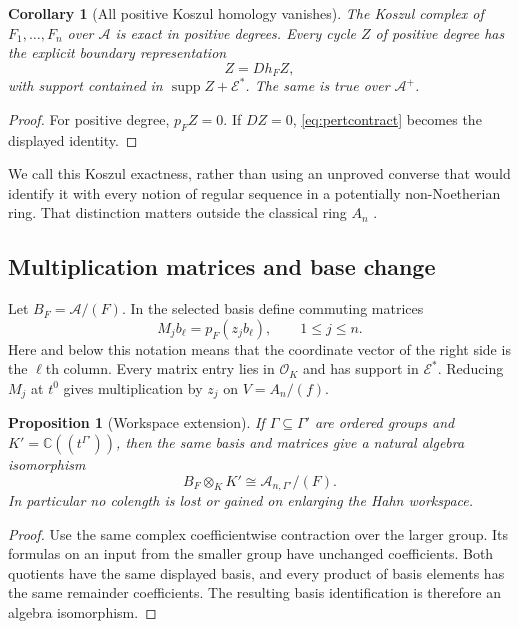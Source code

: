 \documentclass[11pt,letterpaper]{article}
\newtheorem{proposition}[proposition]{Proposition}
\newtheorem{corollary}[corollary]{Corollary}
\theoremstyle{definition}
\theoremstyle{remark}
\newcommand{\C}{\mathbb C}
\newcommand{\A}{\mathscr A}
\newcommand{\OO}{\mathcal O}
\newcommand{\EE}{\mathcal E}
\newcommand{\supp}{\operatorname{supp}}
\numberwithin{equation}{section}
\begin{document}
\begin{corollary}[All positive Koszul homology vanishes]\label{cor:syzygies}
The Koszul complex of $F_1,\ldots,F_n$ over $\A$ is exact in positive degrees. Every cycle $Z$ of positive degree has the explicit boundary representation
\[
 Z=Dh_FZ,
\]
with support contained in $\supp Z+\EE^*$. The same is true over $\A^+$.
\end{corollary}
\begin{proof}
For positive degree, $p_FZ=0$. If $DZ=0$, \eqref{eq:pertcontract} becomes the displayed identity.
\end{proof}
We call this Koszul exactness, rather than using an unproved converse that would identify it with every notion of regular sequence in a potentially non-Noetherian ring. That distinction matters outside the classical ring $A_n$ \cite{StacksKoszul}.

\subsection{Multiplication matrices and base change}
Let $B_F=\A/(F)$. In the selected basis define commuting matrices
\begin{equation}\label{eq:matrices}
 M_j b_\ell=p_F(z_jb_\ell),\qquad 1\leq j\leq n.
\end{equation}
Here and below this notation means that the coordinate vector of the right side is the $\ell$th column. Every matrix entry lies in $\OO_K$ and has support in $\EE^*$. Reducing $M_j$ at $t^0$ gives multiplication by $z_j$ on $V=A_n/(f)$.

\begin{proposition}[Workspace extension]\label{prop:basechange}
If $\Gamma\subseteq\Gamma'$ are ordered groups and $K' =\C((t^{\Gamma'}))$, then the same basis and matrices give a natural algebra isomorphism
\[
 B_F\otimes_KK'\cong\A_{n,\Gamma'}/(F).
\]
In particular no colength is lost or gained on enlarging the Hahn workspace.
\end{proposition}
\begin{proof}
Use the same complex coefficientwise contraction over the larger group. Its formulas on an input from the smaller group have unchanged coefficients. Both quotients have the same displayed basis, and every product of basis elements has the same remainder coefficients. The resulting basis identification is therefore an algebra isomorphism.
\end{proof}
\end{document}
